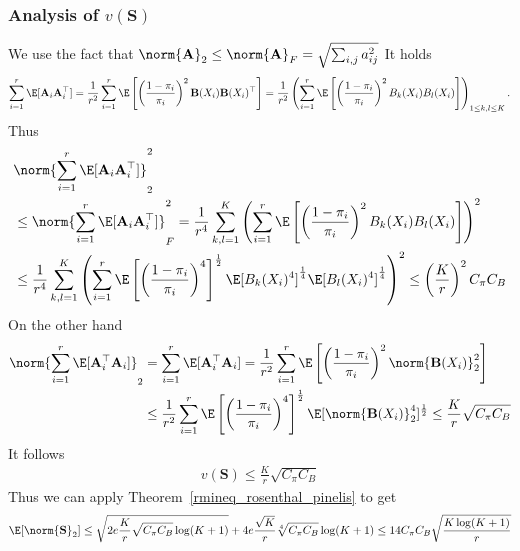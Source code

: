 \subsubsection*{Analysis of $v(\mathbf{S})$}
We use the fact that 
$
  \norm{\mathbf{A}}_2 
  \le
  \norm{\mathbf{A}}_F
  =
  \sqrt{
    \sum_{i,j}^{}
    a_{ij}^2
  }
$
It holds
\begin{gather}
  \sum_{i=1}^{r}
  \E[\mathbf{A}_i\mathbf{A}_i^\top]
  =
  \frac{1}{r^2}
  \sum_{i=1}^{r}
  \E
  \left[ 
    \left( 
      \frac{1-\pi_i}{\pi_i}
    \right)^2
    \mathbf{B}(X_i)\mathbf{B}(X_i)^\top
  \right]
  =
  \frac{1}{r^2}
  \left( 
    \sum_{i=1}^{r}
    \E
    \left[ 
    \left( 
      \frac{1-\pi_i}{\pi_i}
    \right)^2
    B_k(X_i)B_l(X_i)
    \right]
  \right)
  _{1\le k,l \le K}
  .
\end{gather}
Thus
\begin{align}
  \begin{split}
  &\norm{
  \sum_{i=1}^{r}
  \E[\mathbf{A}_i\mathbf{A}_i^\top]
  }_2^2
  \\
  &\le
  \norm{
  \sum_{i=1}^{r}
  \E[\mathbf{A}_i\mathbf{A}_i^\top]
  }_F^2
  =
  \frac{1}{r^4}
  \sum_{k,l=1}^{K}
  \left( 
    \sum_{i=1}^{r}
    \E
    \left[ 
    \left( 
      \frac{1-\pi_i}{\pi_i}
    \right)^2
    B_k(X_i)B_l(X_i)
    \right]
  \right)^2
  \\
  &\le
  \frac{1}{r^4}
  \sum_{k,l=1}^{K}
  \left( 
    \sum_{i=1}^{r}
    \E
    \left[ 
    \left( 
      \frac{1-\pi_i}{\pi_i}
    \right)^4
    \right]
    ^\frac{1}{2}
    \E[
    B_k(X_i)^4
    ]^\frac{1}{4}
    \E[
    B_l(X_i)^4
    ]^\frac{1}{4}
  \right)^2
  \le
  \left(
  \frac{K}{r}
  \right)^2
  C_\pi C_B
  \end{split}
\end{align}
On the other hand
\begin{align}
  \begin{split}
  \norm{
  \sum_{i=1}^{r}
  \E[\mathbf{A}^\top_i\mathbf{A}_i]
  }_2
  &=
  \sum_{i=1}^{r}
  \E[\mathbf{A}^\top_i\mathbf{A}_i]
  =
  \frac{1}{r^2}
    \sum_{i=1}^{r}
    \E
    \left[ 
    \left( 
      \frac{1-\pi_i}{\pi_i}
    \right)^2
    \norm{\mathbf{B}(X_i)}_2^2
    \right]
    \\
    &\le
  \frac{1}{r^2}
    \sum_{i=1}^{r}
    \E
    \left[ 
    \left( 
      \frac{1-\pi_i}{\pi_i}
    \right)^4
    \right]^\frac{1}{2}
    \E[
    \norm{\mathbf{B}(X_i)}_2^4
    ]^\frac{1}{2}
    \le
    \frac{K}{r}\sqrt{
  C_\pi C_B
    }
  \end{split}
\end{align}
It follows
\begin{gather}
  v(\mathbf{S})
  \le
    \frac{K}{r}\sqrt{
  C_\pi C_B
  }
\end{gather}
Thus we can apply Theorem~\ref{rmineq_rosenthal_pinelis}
to get
\begin{gather}
  \E[\norm{\mathbf{S}}_2]
  \le
  \sqrt{
    2e 
    \frac{K}{r}\sqrt{
  C_\pi C_B
  }
  \log
  (K+1)
  }
  +
  4e
  \frac{\sqrt{K}}{r}
  \sqrt[4]{
  C_\pi C_B
  }
  \log
  (K+1)
  \le
  14
  C_\pi C_B
  \sqrt{
    \frac{K \log(K+1)}{r}
  }
\end{gather}
